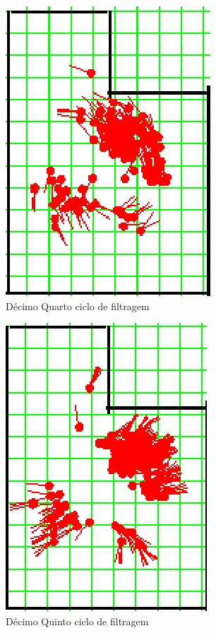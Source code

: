 \begin{figure}[H]
  \centering
  \includegraphics[scale=1]{figuras/cen1_ex3/15.eps}
  \caption[Décimo Quarto Ciclo de Filtragem]{Décimo Quarto ciclo de filtragem}
  \label{img:cen1_ex3_15}
\end{figure}

\begin{figure}[H]
  \centering
  \includegraphics[scale=1]{figuras/cen1_ex3/16.eps}
  \caption[Décimo Quinto Ciclo de Filtragem]{Décimo Quinto ciclo de filtragem}
  \label{img:cen1_ex3_16}
\end{figure}


